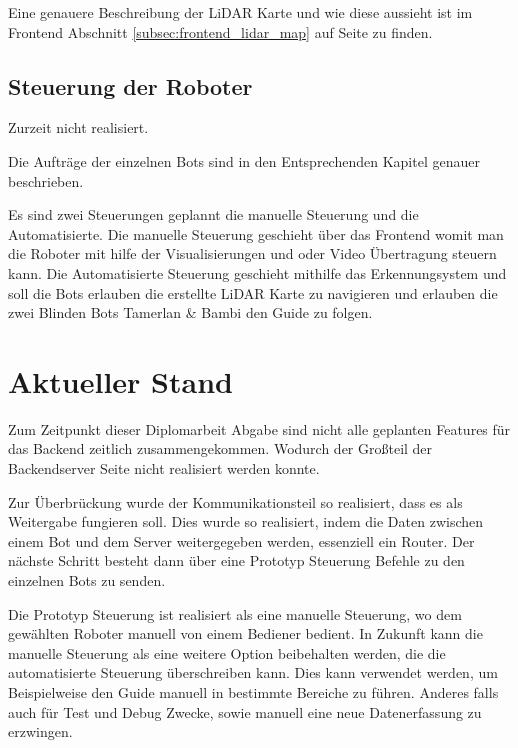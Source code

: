 Eine genauere Beschreibung der LiDAR Karte und wie diese aussieht
ist im Frontend Abschnitt \ref{subsec:frontend_lidar_map} 
auf Seite \pageref{subsec:frontend_lidar_map} zu finden.

\subsection{Steuerung der Roboter}
\label{subsec:backend_robot_detection}
Zurzeit nicht realisiert.

Die Aufträge der einzelnen Bots sind in den Entsprechenden Kapitel genauer beschrieben.

Es sind zwei Steuerungen geplannt die manuelle Steuerung 
und die Automatisierte.
% 
Die manuelle Steuerung geschieht über das Frontend 
womit man die Roboter mit hilfe der Visualisierungen 
und oder Video Übertragung steuern kann.
% 
Die Automatisierte Steuerung geschieht mithilfe das Erkennungsystem 
und soll die Bots erlauben die erstellte LiDAR Karte zu navigieren
und erlauben die zwei Blinden Bots Tamerlan \& Bambi den Guide zu folgen.

\section{Aktueller Stand}
\label{subsec:backend_aktueller_stand}
Zum Zeitpunkt dieser Diplomarbeit Abgabe 
sind nicht alle geplanten Features für das Backend zeitlich zusammengekommen.
Wodurch der Großteil der Backendserver Seite nicht realisiert werden konnte.

Zur Überbrückung wurde der Kommunikationsteil so realisiert, 
dass es als Weitergabe fungieren soll.
Dies wurde so realisiert, indem die Daten 
zwischen einem Bot und dem Server weitergegeben werden, essenziell ein Router. 
Der nächste Schritt besteht dann über eine Prototyp Steuerung 
Befehle zu den einzelnen Bots zu senden.

Die Prototyp Steuerung ist realisiert als eine manuelle Steuerung, 
wo dem gewählten Roboter manuell von einem Bediener bedient.
In Zukunft kann die manuelle Steuerung als eine weitere Option beibehalten werden, 
die die automatisierte Steuerung überschreiben kann. 
Dies kann verwendet werden, 
um Beispielweise den Guide manuell in bestimmte Bereiche zu führen.
Anderes falls auch für Test und Debug Zwecke, 
sowie manuell eine neue Datenerfassung zu erzwingen.

